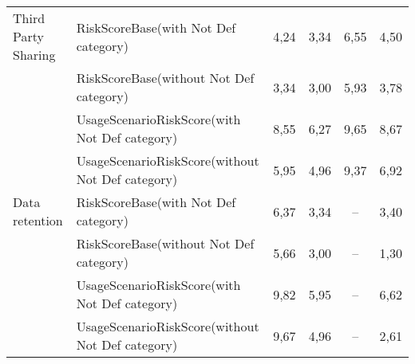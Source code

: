 \documentclass[../main]{subfiles}
\begin{document}
\begin{ltwrap}{2mm}{1.7}{\footnotesize}
\begin{longtable}[H]{|M{.15\x}|M{.28\x}|C{.1475\x}|C{.1475\x}|C{.1475\x}|C{.1475\x}|}
        \hline

        Third Party Sharing
        & RiskScoreBase\newline(with Not Def category)
        & 4,24
        & 3,34
        & 6,55
        & 4,50\\

        
        & RiskScoreBase\newline(without Not Def category)
        & 3,34
        & 3,00
        & 5,93
        & 3,78\\

        
        & UsageScenarioRiskScore\newline(with Not Def category)
        & 8,55
        & 6,27
        & 9,65
        & 8,67\\

        
        & UsageScenarioRiskScore\newline(without Not Def category)
        & 5,95
        & 4,96
        & 9,37
        & 6,92\\
        
        \hline

        Data retention
        & RiskScoreBase\newline(with Not Def category)
        & 6,37
        & 3,34
        & --
        & 3,40\\

        
        & RiskScoreBase\newline(without Not Def category)
        & 5,66
        & 3,00
        & --
        & 1,30\\

        
        & UsageScenarioRiskScore\newline(with Not Def category)
        & 9,82
        & 5,95
        & --
        & 6,62\\

        
        & UsageScenarioRiskScore\newline(without Not Def category)
        & 9,67
        & 4,96
        & --
        & 2,61\\\hline
        
    \end{longtable}
\end{ltwrap}
\end{document}
